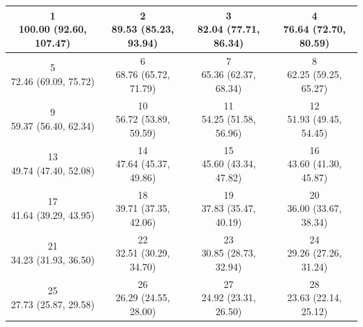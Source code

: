 \begin{table}[htbp]
\centering
\scriptsize
\begin{tabular}{cccc}
\hline
\shortstack[c]{1\\100.00 (92.60, 107.47)} & \shortstack[c]{2\\89.53 (85.23, 93.94)} & \shortstack[c]{3\\82.04 (77.71, 86.34)} & \shortstack[c]{4\\76.64 (72.70, 80.59)} \\
\hline
\shortstack[c]{5\\72.46 (69.09, 75.72)} & \shortstack[c]{6\\68.76 (65.72, 71.79)} & \shortstack[c]{7\\65.36 (62.37, 68.34)} & \shortstack[c]{8\\62.25 (59.25, 65.27)} \\
\hline
\shortstack[c]{9\\59.37 (56.40, 62.34)} & \shortstack[c]{10\\56.72 (53.89, 59.59)} & \shortstack[c]{11\\54.25 (51.58, 56.96)} & \shortstack[c]{12\\51.93 (49.45, 54.45)} \\
\hline
\shortstack[c]{13\\49.74 (47.40, 52.08)} & \shortstack[c]{14\\47.64 (45.37, 49.86)} & \shortstack[c]{15\\45.60 (43.34, 47.82)} & \shortstack[c]{16\\43.60 (41.30, 45.87)} \\
\hline
\shortstack[c]{17\\41.64 (39.29, 43.95)} & \shortstack[c]{18\\39.71 (37.35, 42.06)} & \shortstack[c]{19\\37.83 (35.47, 40.19)} & \shortstack[c]{20\\36.00 (33.67, 38.34)} \\
\hline
\shortstack[c]{21\\34.23 (31.93, 36.50)} & \shortstack[c]{22\\32.51 (30.29, 34.70)} & \shortstack[c]{23\\30.85 (28.73, 32.94)} & \shortstack[c]{24\\29.26 (27.26, 31.24)} \\
\hline
\shortstack[c]{25\\27.73 (25.87, 29.58)} & \shortstack[c]{26\\26.29 (24.55, 28.00)} & \shortstack[c]{27\\24.92 (23.31, 26.50)} & \shortstack[c]{28\\23.63 (22.14, 25.12)} \\

\end{tabular}
\end{table}
